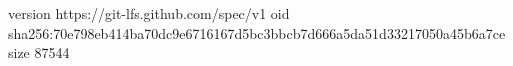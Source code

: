 version https://git-lfs.github.com/spec/v1
oid sha256:70e798eb414ba70dc9e6716167d5bc3bbcb7d666a5da51d33217050a45b6a7ce
size 87544
